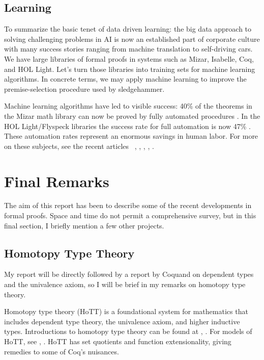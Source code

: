 \documentclass[brochure,english,12pt]{bourbaki}
\theoremstyle{plain}
\begin{document}
\subsection{Learning}


To summarize the basic tenet of data driven learning: the big data approach to solving
challenging problems in AI is now  an established part of corporate
culture with many success stories ranging from machine translation to self-driving cars.
We have large libraries of formal proofs in systems such
as Mizar, Isabelle, Coq, and HOL Light.  
Let's turn those libraries into training sets for machine learning algorithms.
In concrete terms, we may apply machine learning to improve the premise-selection procedure
used by sledgehammer.  

Machine learning algorithms have led to visible success: 40\% of the
theorems in the Mizar math library can now be proved by fully automated procedures \cite{DBLP:journals/corr/KaliszykU13b}.  
In the HOL Light/Flyspeck
libraries the success rate for full automation is now 47\% \cite{kaliszyk2014learning}.
These automation rates represent an enormous savings in human labor.
For more on these subjects, see the recent articles
~\cite{bohme2010sledgehammer}, 
\cite{urban2010evaluation},  
\cite{kaliszyk2012learning}, \cite{kaliszyk2013automated},
\cite{alama2014premise}.

\section{Final Remarks}

The aim of this report has been to describe some of the recent developments in formal proofs.
Space and time do not permit a comprehensive survey, but in this final section, I briefly mention
a few other projects.


\subsection{Homotopy Type Theory}

My report will be directly followed by a report by Coquand on dependent types and
the univalence axiom, so I will be brief in my remarks on homotopy type theory.

Homotopy type theory (HoTT) is a foundational system for mathematics that includes
dependent type theory, the univalence axiom, and higher inductive types.  
Introductions to homotopy type theory can be found at
\cite{hottbook},  \cite{pelayo2012homotopy}.
For models of HoTT, see \cite{awodey2007homotopy}, \cite{kapulkin2012simplicial}.
HoTT has set quotients and function extensionality, giving remedies to some  of Coq's nuisances. 
\end{document}
